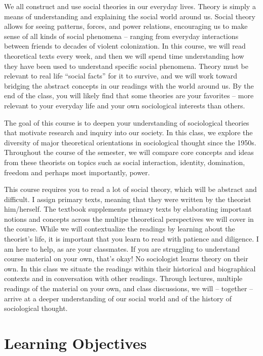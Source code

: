 \documentclass[11pt,]{article}
\begin{document}
We all construct and use social theories in our everyday lives. Theory
is simply a means of understanding and explaining the social world
around us. Social theory allows for seeing patterns, forces, and power
relations, encouraging us to make sense of all kinds of social phenomena
-- ranging from everyday interactions between friends to decades of
violent colonization. In this course, we will read theoretical texts
every week, and then we will spend time understanding how they have been
used to understand specific social phenomena. Theory must be relevant to
real life ``social facts'' for it to survive, and we will work toward
bridging the abstract concepts in our readings with the world around us.
By the end of the class, you will likely find that some theories are
your favorites -- more relevant to your everyday life and your own
sociological interests than others.

The goal of this course is to deepen your understanding of sociological
theories that motivate research and inquiry into our society. In this
class, we explore the diversity of major theoretical orientations in
sociological thought since the 1950s. Throughout the course of the
semester, we will compare core concepts and ideas from these theorists
on topics such as social interaction, identity, domination, freedom and
perhaps most importantly, power.

This course requires you to read a lot of social theory, which will be
abstract and difficult. I assign primary texts, meaning that they were
written by the theorist him/herself. The textbook supplements primary
texts by elaborating important notions and concepts across the multipe
theoretical perspectives we will cover in the course. While we will
contextualize the readings by learning about the theorist's life, it is
important that you learn to read with patience and diligence. I am here
to help, as are your classmates. If you are struggling to understand
course material on your own, that's okay! No sociologist learns theory
on their own. In this class we situate the readings within their
historical and biographical contexts and in conversation with other
readings. Through lectures, multiple readings of the material on your
own, and class discussions, we will -- together -- arrive at a deeper
understanding of our social world and of the history of sociological
thought.

\hypertarget{learning-objectives}{%
\section{Learning Objectives}\label{learning-objectives}}
\end{document}
